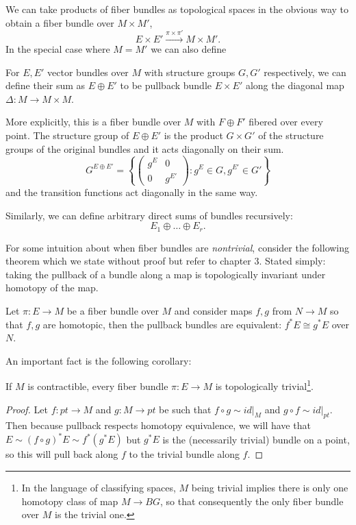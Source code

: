 		We can take products of fiber bundles as topological spaces in the obvious way to obtain a fiber bundle over $M \times M'$,
		\[
			E \times E' \xrightarrow{\pi \times \pi'} M \times M'.
		\]
		In the special case where $M = M'$ we can also define 
		\begin{defn}
			For $E, E'$ vector bundles over $M$ with structure groups $G, G'$ respectively, we can define their sum as $E \oplus E'$ to be pullback bundle $E \times E'$ along the diagonal map $\Delta: M \rightarrow M \times M$.
			
			More explicitly, this is a fiber bundle over $M$ with $F \oplus F'$ fibered over every point. 
			The structure group of $E \oplus E'$ is the product $G \times G'$ of the structure groups of the original bundles and it acts diagonally on their sum.
			\begin{equation}
				G^{E \oplus E'} = \left \{ \begin{pmatrix}
					g^E & 0 \\
					0 & g^{E'}
				\end{pmatrix} : g^E \in G, g^{E'} \in G' \right \}
			\end{equation}
			and the transition functions act diagonally in the same way. 
		\end{defn}
		Similarly, we can define arbitrary direct sums of bundles recursively:
		\begin{equation}
			E_1 \oplus \dots \oplus E_r.
		\end{equation}
		
		
		For some intuition about when fiber bundles are \emph{nontrivial}, consider the following theorem which we state without proof but refer to \cite{bott1982} chapter 3. Stated simply: taking the pullback of a bundle along a map is topologically invariant under homotopy of the map. 
		\begin{theorem}
			Let $\pi:E \rightarrow M$ be a fiber bundle over $M$ and consider maps $f, g$ from $N \rightarrow M$ so that $f, g$ are homotopic, then the pullback bundles are equivalent: $f^* E \cong g^* E$ over $N$.
		\end{theorem}
		An important fact is the following corollary:
		\begin{cor}
			If $M$ is contractible, every fiber bundle $\pi: E \rightarrow M$ is topologically trivial\footnote{In the language of classifying spaces, $M$ being trivial implies there is only one homotopy class of map $M \to BG$, so that consequently the only fiber bundle over $M$ is the trivial one.}.
		\end{cor}
		\begin{proof}
			Let $f: pt \to M$ and $g: M \to pt$ be such that $f \circ g \sim id|_M$ and $g \circ f \sim id|_{pt}$. Then because pullback respects homotopy equivalence, we will have that $E \sim (f \circ g)^* E \sim f^* (g^*E)$ but $g^* E$ is the (necessarily trivial) bundle on a point, so this will pull back along $f$ to the trivial bundle along $f$.
		\end{proof}
		
